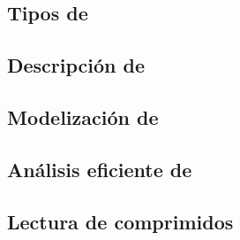 




\subsection{Tipos de \transacciones}
\label{sec:clasificacion:transacciones-tipo-ii:tipos-de-transacciones}





\subsection{Descripción de \mushroom}
\label{sec:clasificacion:transacciones-tipo-ii:descripcion-de-mushroom}





\subsection{Modelización de \Registros}
\label{sec:clasificacion:transacciones-tipo-ii:modelizacion}





\subsection{Análisis eficiente de \Registros}
\label{sec:clasificacion:transacciones-tipo-ii:analisis-eficiente}





\subsection{Lectura de \datasets comprimidos}
\label{sec:clasificacion:transacciones-tipo-ii:lectura}

